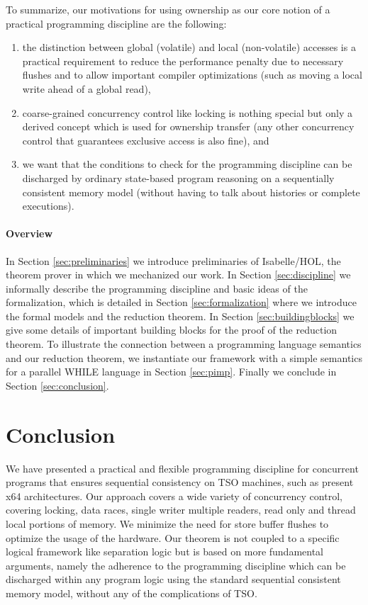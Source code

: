 \documentclass[11pt]{llncs}
\begin{document}
To summarize, our motivations for using ownership as our core notion of a
practical programming discipline are the following:
\begin{enumerate}
\item the distinction between global (volatile) and local (non-volatile) accesses is a practical requirement to
reduce the performance penalty due to necessary flushes and to allow important compiler optimizations
(such as moving a local write ahead of a global read),
\item coarse-grained concurrency control like locking is nothing special but only a derived concept which is
used for ownership transfer (any other concurrency control that guarantees exclusive access is also fine), and
\item we want that the conditions to check for the programming discipline can be discharged by ordinary state-based
program reasoning on a sequentially consistent memory model
(without having to talk about histories or complete executions).
\end{enumerate}

\paragraph{Overview}
In Section \ref{sec:preliminaries} we introduce preliminaries of
Isabelle/HOL, the theorem prover in which we mechanized our work. In
Section \ref{sec:discipline} we informally describe the programming
discipline and basic ideas of the formalization, which is detailed in
Section \ref{sec:formalization} where we introduce the formal models and the
reduction theorem.
In Section \ref{sec:buildingblocks} we give some details of important building blocks
for the proof of the reduction theorem.
To illustrate the connection between a programming language semantics and our reduction theorem, we instantiate our
framework with a simple semantics for a parallel WHILE language in Section \ref{sec:pimp}.
Finally we conclude in Section \ref{sec:conclusion}.


%


\section{Conclusion \label{sec:conclusion}}

We have presented a practical and flexible  programming
discipline for concurrent programs that ensures sequential consistency on TSO machines, such
as present x64 architectures. Our approach covers a wide
variety of concurrency control, covering locking, data races, single
writer multiple readers, read only and thread local portions of
memory.  We minimize the need for store buffer flushes to optimize the
usage of the hardware.  Our theorem is not coupled to a specific
logical framework like separation logic but is based on more
fundamental arguments, namely the adherence to the programming discipline
which can be discharged within any program logic using the standard sequential
consistent memory model,  without any of the complications of TSO.
\end{document}
